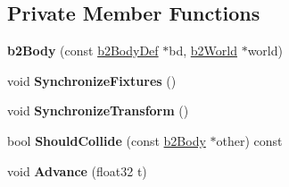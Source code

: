 \subsection*{Private Member Functions}
\begin{DoxyCompactItemize}
\item 
\mbox{\label{classb2Body_a3d2589a2eb6a76898660b41092141d13}} 
{\bfseries b2\+Body} (const \mbox{\hyperlink{structb2BodyDef}{b2\+Body\+Def}} $\ast$bd, \mbox{\hyperlink{classb2World}{b2\+World}} $\ast$world)
\item 
\mbox{\label{classb2Body_af8a192d14f97e7a356f6b9cc69fafa10}} 
void {\bfseries Synchronize\+Fixtures} ()
\item 
\mbox{\label{classb2Body_a4ce4a12de31c4e877ac5075331cb3a47}} 
void {\bfseries Synchronize\+Transform} ()
\item 
\mbox{\label{classb2Body_a7f7345974b71e40cf63a5041221af374}} 
bool {\bfseries Should\+Collide} (const \mbox{\hyperlink{classb2Body}{b2\+Body}} $\ast$other) const
\item 
\mbox{\label{classb2Body_a018ca81f6c1bef31942931dfa9459f4f}} 
void {\bfseries Advance} (float32 t)
\end{DoxyCompactItemize}
